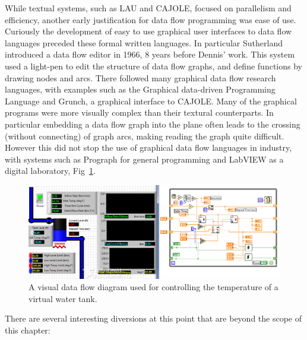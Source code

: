 While textual systems, such as LAU\cite{Plas76} and CAJOLE\cite{Hankin81}, focused on parallelism and efficiency, another early justification for data flow programming was ease of use. Curiously the development of easy to use graphical user interfaces to data flow languages preceded these formal written languages. In particular Sutherland introduced a data flow editor\cite{Sutherland66} in 1966, 8 years before Dennis' work. This system used a light-pen to edit the structure of data flow graphs, and define functions by drawing nodes and arcs. There followed many graphical data flow research languages, with examples such as the Graphical data-driven Programming Language\cite{Davis81} and Grunch\cite{Jong82}, a graphical interface to CAJOLE. Many of the graphical programs were more visually complex than their textural counterparts. In particular embedding a data flow graph into the plane often leads to the crossing (without connecting) of graph arcs, making reading the graph quite difficult. However this did not stop the use of graphical data flow languages in industry, with systems such as Prograph\cite{Matwin1985} for general programming and LabVIEW\cite{labview} as a digital laboratory, Fig~\ref{fig:labview}.

\begin{figure}
\centering
\includegraphics[width = 0.8\columnwidth]{labview.png}
\caption[The Labview graphical data flow language]{A visual data flow diagram used for controlling the temperature of a virtual water tank.}
\label{fig:labview}
\end{figure}

There are several interesting diversions at this point that are beyond the scope of this chapter:


